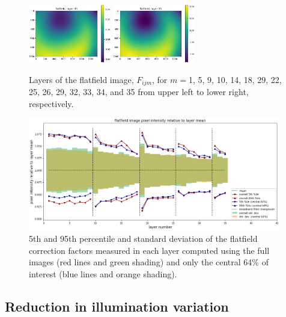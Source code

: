 \documentclass[letterpaper,11pt]{article}
\begin{document}
\begin{figure}[!ht]
\includegraphics[width=0.32\textwidth]{images/results/flatfield_layers/flatfield_layer_34}
\includegraphics[width=0.32\textwidth]{images/results/flatfield_layers/flatfield_layer_35}
\caption{\footnotesize Layers of the flatfield image, $F_{ijm}$, for $m=$1, 5, 9, 10, 14, 18, 29, 22, 25, 26, 29, 32, 33, 34, and 35 from upper left to lower right, respectively.}
\label{fig:flatfield_image_layers_vectra}
\end{figure}

\begin{figure}[!ht]
\centering
\includegraphics[width=0.98\textwidth]{images/results/flatfield_pixel_intensities_vectra}
\caption{\footnotesize 5th and 95th percentile and standard deviation of the flatfield correction factors measured in each layer computed using the full images (red lines and green shading) and only the central 64\% of interest (blue lines and orange shading).}
\label{fig:flatfield_pixel_intensities}
\end{figure} 

\subsection{Reduction in illumination variation}
\label{ssec:reduction_in_illumination_variation}
\end{document}

